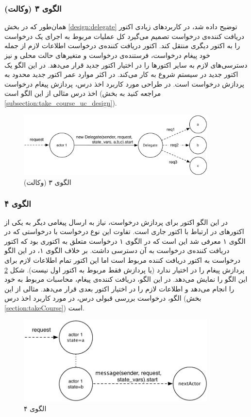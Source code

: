 \subsubsection{الگوی ۳ (وکالت)}
همان‌طور که در بخش \ref{design:delegate} توضیح داده شد، در کاربردهای زیادی اکتور دریافت کننده‌ی درخواست تصمیم می‌گیرد کل عملیات مربوط به اجرای یک درخواست را به اکتور دیگری منتقل کند. اکتور دریافت کننده‌ی درخواست اطلاعات لازم از جمله خود پیغام درخواست، فرستنده‌ی درخواست و متغیرهای حالت محلی و نیز دسترسی‌های لازم به سایر اکتورها را در اختیار اکتور جدید قرار می‌دهد. در این الگو یک اکتور جدید در سیستم شروع به کار می‌کند. در اکثر موارد عمر اکتور جدید محدود به پردازش درخواست است. در طراحی مورد کاربرد اخذ درس، پردازش پیغام درخواست اخذ درس مثالی از این الگو است (مراجعه کنید به بخش \ref{subsection:take_course_uc_design}).
\begin{figure}[hb]
    \begin{center}
	\includegraphics[width=10cm]{4-ProposedFramework/Figures/Patterns_stateless_Delegate.pdf}
    \end{center}
    \caption{\label{fig:Patterns_stateless_delegate}الگوی ۳ (وکالت)}
\end{figure}

\subsubsection{الگوی ۴}
در این الگو اکتور برای پردازش درخواست، نیاز به ارسال پیغامی دیگر به یکی از اکتورهای در ارتباط با اکتور جاری است. تفاوت این نوع درخواست با درخواستی که در الگوی ۱ معرفی شد این است که در الگوی ۱ درخواست متعلق به اکتوری بود که اکتور دریافت کننده‌ی درخواست به آن دسترسی داشت. بر خلاف الگوی ۱، در این الگو درخواست به اکتور دریافت کننده مربوط است اما این اکتور تمام اطلاعات لازم برای پردازش پیغام را در اختیار ندارد (یا پردازش فقط مربوط به اکتور اول نیست). شکل \ref{fig:Patterns_stateless_4} این الگو را نمایش می‌دهد. در این الگو، دریافت کننده‌ی پیغام، محاسبات مربوط به خود را انجام می‌دهد و اطلاعات لازم را در اختیار اکتور بعدی قرار می‌دهد. مثالی از این الگو، درخواست بررسی قبولی درس، در مورد کاربرد اخذ درس (بخش \ref{section:takeCourse}) است.
\begin{figure}[hb]
    \begin{center}
	\includegraphics[width=10cm]{4-ProposedFramework/Figures/Patterns_stateless_4.pdf}
    \end{center}
    \caption{\label{fig:Patterns_stateless_4}الگوی ۴}
\end{figure}

